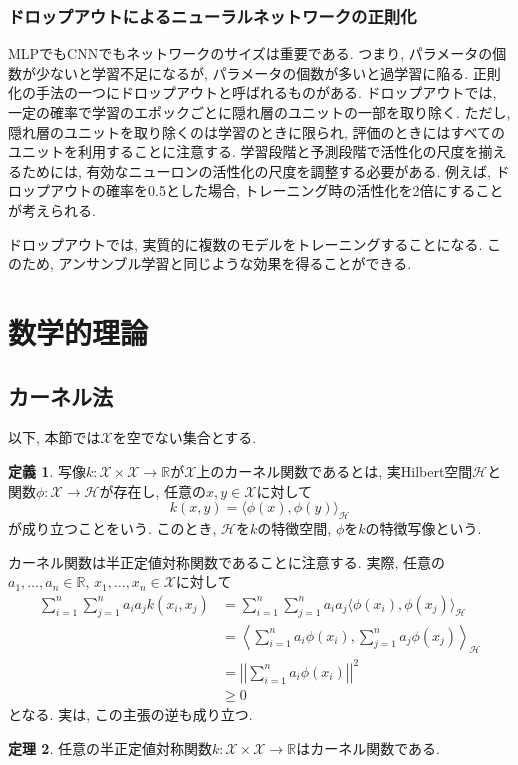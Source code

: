 \documentclass[uplatex]{jsarticle}
\theoremstyle{definition}
\newtheorem{definition}{定義}[section]
\newtheorem{theorem}[definition]{定理}
\numberwithin{equation}{section}
\newcommand{\R}{\mathbb{R}}
\newcommand{\norm}[1]{\left|\left|#1\right|\right|}
\begin{document}
\subsubsection{ドロップアウトによるニューラルネットワークの正則化}
MLPでもCNNでもネットワークのサイズは重要である.
つまり, パラメータの個数が少ないと学習不足になるが, パラメータの個数が多いと過学習に陥る.
正則化の手法の一つにドロップアウトと呼ばれるものがある.
ドロップアウトでは, 一定の確率で学習のエポックごとに隠れ層のユニットの一部を取り除く.
ただし, 隠れ層のユニットを取り除くのは学習のときに限られ, 評価のときにはすべてのユニットを利用することに注意する.
学習段階と予測段階で活性化の尺度を揃えるためには, 有効なニューロンの活性化の尺度を調整する必要がある.
例えば, ドロップアウトの確率を0.5とした場合, トレーニング時の活性化を2倍にすることが考えられる.

ドロップアウトでは, 実質的に複数のモデルをトレーニングすることになる.
このため, アンサンブル学習と同じような効果を得ることができる.


\section{数学的理論}
\subsection{カーネル法}
以下, 本節では$\mathcal{X}$を空でない集合とする.
\begin{definition}
    写像$k \colon \mathcal{X} \times \mathcal{X} \to \R$が$\mathcal{X}$上のカーネル関数であるとは, 実Hilbert空間$\mathcal{H}$と関数$\phi \colon \mathcal{X} \to \mathcal{H}$が存在し, 任意の$x, y \in \mathcal{X}$に対して
    \begin{equation}
        k(x, y) = \langle\phi(x), \phi(y)\rangle_{\mathcal{H}}
    \end{equation}
    が成り立つことをいう.
    このとき, $\mathcal{H}$を$k$の特徴空間, $\phi$を$k$の特徴写像という.
\end{definition}
カーネル関数は半正定値対称関数であることに注意する.
実際, 任意の$a_{1}, \dots, a_{n} \in \R$, $x_{1}, \dots, x_{n} \in \mathcal{X}$に対して
\begin{align*}
    \sum_{i = 1}^{n} \sum_{j = 1}^{n} a_{i}a_{j}k(x_{i}, x_{j})
    &= \sum_{i = 1}^{n} \sum_{j = 1}^{n} a_{i}a_{j}\langle\phi(x_{i}), \phi(x_{j})\rangle_{\mathcal{H}} \\
    &= \left\langle\sum_{i = 1}^{n} a_{i}\phi(x_{i}), \sum_{j = 1}^{n} a_{j}\phi(x_{j})\right\rangle_{\mathcal{H}} \\
    &= \norm{\sum_{i = 1}^{n} a_{i}\phi(x_{i})}^{2} \\
    &\geq 0
\end{align*}
となる.
実は, この主張の逆も成り立つ.
\begin{theorem}
    任意の半正定値対称関数$k \colon \mathcal{X} \times \mathcal{X} \to \R$はカーネル関数である.
\end{theorem}
\end{document}
